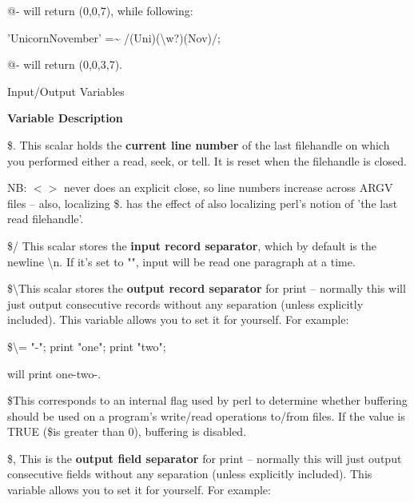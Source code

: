 \documentclass[a4paper,11pt]{book}
\begin{document}
\noindent @- will return (0,0,7), while following:

\noindent 

\noindent 'UnicornNovember' =\~{} /(Uni)(\textbackslash w?)(Nov)/;

\noindent 

\noindent @- will return (0,0,3,7).

\noindent 

\noindent 

\noindent 

\noindent Input/Output Variables

\noindent 

\noindent \textbf{Variable Description}

\noindent 

\noindent \$. This scalar holds the \textbf{current line number }of the last filehandle on which you performed either a read, seek, or  tell. It is reset when the filehandle is closed.

\noindent 

\noindent NB: $<$$>$ never does an explicit close, so line numbers increase across ARGV files -- also, localizing \$. has the effect of also localizing perl's notion of 'the last read filehandle'.

\noindent 

\noindent \$/ This scalar stores the \textbf{input record separator}, which by default is the newline \textbackslash n. If it's set to "", input will be read one paragraph at a time.

\noindent 

\noindent \$\textbackslash  This scalar stores the \textbf{output record separator }for print -- normally this will just output consecutive records without any separation (unless explicitly included). This variable allows you to set it for yourself. For example:

\noindent 

\noindent \$\textbackslash  = "-"; print "one"; print "two";

\noindent will print one-two-.

\noindent 

\noindent \$\textbar  This corresponds to an internal flag used by perl to determine whether buffering should be used on a program's write/read operations to/from files. If the value is TRUE (\$\textbar  is greater than 0), buffering is disabled.

\noindent 

\noindent \$, This is the \textbf{output field separator }for print -- normally this will just output consecutive fields without any separation (unless explicitly included). This variable allows you to set it for yourself. For example:
\end{document}
